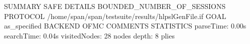 
SUMMARY
  SAFE
DETAILS
  BOUNDED_NUMBER_OF_SESSIONS
PROTOCOL
  /home/span/span/testsuite/results/hlpslGenFile.if
GOAL
  as_specified
BACKEND
  OFMC
COMMENTS
STATISTICS
  parseTime: 0.00s
  searchTime: 0.04s
  visitedNodes: 28 nodes
  depth: 8 plies
